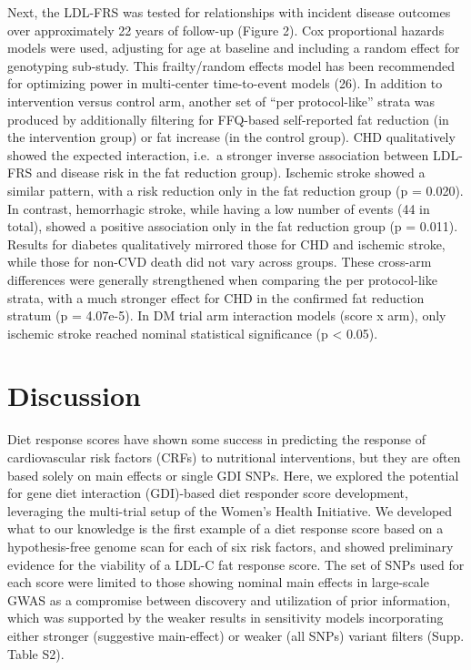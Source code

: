 \documentclass[]{article}
\begin{document}
Next, the LDL-FRS was tested for relationships with incident disease
outcomes over approximately 22 years of follow-up (Figure 2). Cox
proportional hazards models were used, adjusting for age at baseline and
including a random effect for genotyping sub-study. This frailty/random
effects model has been recommended for optimizing power in multi-center
time-to-event models (26). In addition to intervention versus control
arm, another set of ``per protocol-like'' strata was produced by
additionally filtering for FFQ-based self-reported fat reduction (in the
intervention group) or fat increase (in the control group). CHD
qualitatively showed the expected interaction, i.e.~a stronger inverse
association between LDL-FRS and disease risk in the fat reduction
group). Ischemic stroke showed a similar pattern, with a risk reduction
only in the fat reduction group (p = 0.020). In contrast, hemorrhagic
stroke, while having a low number of events (44 in total), showed a
positive association only in the fat reduction group (p = 0.011).
Results for diabetes qualitatively mirrored those for CHD and ischemic
stroke, while those for non-CVD death did not vary across groups. These
cross-arm differences were generally strengthened when comparing the per
protocol-like strata, with a much stronger effect for CHD in the
confirmed fat reduction stratum (p = 4.07e-5). In DM trial arm
interaction models (score x arm), only ischemic stroke reached nominal
statistical significance (p \textless{} 0.05).

\hypertarget{discussion}{%
\section{Discussion}\label{discussion}}

Diet response scores have shown some success in predicting the response
of cardiovascular risk factors (CRFs) to nutritional interventions, but
they are often based solely on main effects or single GDI SNPs. Here, we
explored the potential for gene diet interaction (GDI)-based diet
responder score development, leveraging the multi-trial setup of the
Women's Health Initiative. We developed what to our knowledge is the
first example of a diet response score based on a hypothesis-free genome
scan for each of six risk factors, and showed preliminary evidence for
the viability of a LDL-C fat response score. The set of SNPs used for
each score were limited to those showing nominal main effects in
large-scale GWAS as a compromise between discovery and utilization of
prior information, which was supported by the weaker results in
sensitivity models incorporating either stronger (suggestive
main-effect) or weaker (all SNPs) variant filters (Supp. Table S2).
\end{document}
